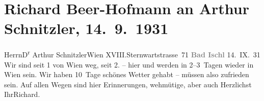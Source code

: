 

         \renewcommand{\erwaehnteOrte}{Orte: Bad Ischl, Sternwartestraße, Wien, XVIII., Währing}
         \renewcommand{\erwaehnteWerke}{}
               \section[Richard Beer-Hofmann an Arthur Schnitzler, 14. 9. 1931]{ Richard Beer-Hofmann an Arthur Schnitzler, 14. 9. 1931}\nopagebreak{}\rehead{ }\begin{ledgroupsized}[t]{13cm}\normalsize\beginnumbering \toendnotes[C]{\smallbreak\pagebreak[2]} 
\toendnotes[C]{\smallbreak}\pstart{}{\pb}Herrn\pend{}\pstart{}D\textsuperscript{r} Arthur Schnitzler\pend{}\pstart{}Wien XVIII.\pend{}\pstart{}Sternwartstrasse 71\pend{}{\bigskip}\pstart
           \noindent{}\centering{}\textcolor{gray}{\textbf{{\pb}Bad Ischl}}\pend
           \pstart
           \centering{}{\pb}14. IX. 31\pend
           \pstart
           Wir sind seit 1 von Wien weg, seit
                  2. – hier und werden in 2–3 Tagen wieder in Wien sein. Wir haben 10 Tage schönes Wetter gehabt – müssen also
               zufrieden sein. Auf allen Wegen sind hier Erinnerungen, wehmütige, aber auch \label{T_L02548_1v}\label{T_L02548_1h}\pend
           \pstart Herzlichst Ihr\spacefill\mbox{Richard.}\pend{}
         
         \endnumbering{}\end{ledgroupsized}  \newcommand{\dateiname}{L02548}\newcommand{\titel}{Richard Beer-Hofmann an Arthur Schnitzler, 14. 9. 1931}\newcommand{\editorInnen}{Martin Anton Müller und Gerd-Hermann Susen}
      